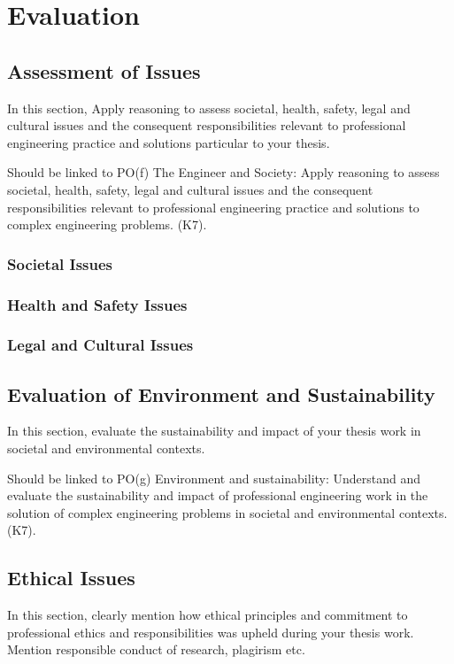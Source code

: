 \chapter{Evaluation}\label{safeklabelingpetersen}

\section{Assessment of Issues}
In this section, Apply reasoning to assess societal, health, safety, legal and cultural issues and the consequent responsibilities relevant to professional engineering practice and solutions particular to your thesis.

Should be linked to PO(f) The Engineer and Society: Apply reasoning to assess societal, health, safety, legal and cultural issues and the consequent responsibilities relevant to professional engineering practice and solutions to complex engineering problems. (K7).
\subsection{Societal Issues}

\subsection{Health and Safety Issues}

\subsection{Legal and Cultural Issues}

\section{Evaluation of Environment and Sustainability}

In this section, evaluate the sustainability and impact of your thesis work in societal and environmental contexts. 

Should be linked to PO(g) Environment and sustainability: Understand and evaluate the sustainability and impact of professional engineering work in the solution of complex engineering problems in societal and environmental contexts. (K7).

\section{Ethical Issues}

In this section, clearly mention how ethical principles and commitment to professional ethics and responsibilities was upheld during your thesis work. Mention responsible conduct of research, plagirism etc.

